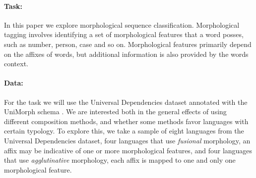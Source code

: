 \documentclass[11pt]{article}
\begin{document}
    
    
    
    \paragraph{Task:} In this paper we explore morphological sequence classification. Morphological tagging involves identifying a set of morphological features that a word posses, such as number, person, case and so on. 
    Morphological features primarily depend on the affixes of words, but additional information is also provided by the words context. 
    
    \paragraph{Data:} For the task we will use the Universal Dependencies dataset \citep{nivre2018} annotated with the UniMorph schema \citep{mccarthy2018marrying}. We are interested both in the general effects of using different composition methods, and whether some methods favor languages with certain typology. To explore this, we take a sample of eight languages from the Universal Dependencies dataset, four languages that use \textit{fusional} morphology, an affix may be indicative of one or more morphological features, and four languages that use \textit{agglutinative} morphology, each affix is mapped to one and only one morphological feature. 
    
\end{document}
